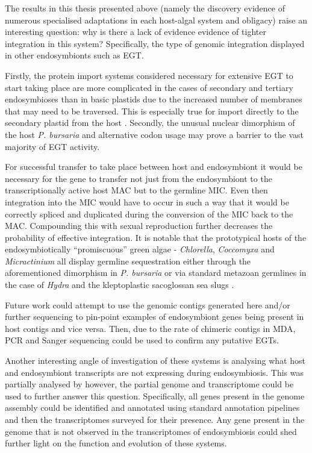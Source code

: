 The results in this thesis presented above (namely the discovery evidence
of numerous specialised adaptations in each host-algal system and 
obligacy) raise an interesting question:
why is there a lack of evidence evidence of tighter 
integration in this system?  Specifically, the type of genomic
integration displayed in other endosymbionts such as EGT.

Firstly, the protein import systems considered necessary for extensive
EGT to start taking place are more complicated
in the cases of secondary and tertiary endosymbioses
than in basic plastids due to the increased number
of membranes that may need to be traversed. This is especially true
for import directly to the secondary plastid from the
host \citep{Hirakawa2012}.
Secondly, the unusual nuclear dimorphism of the host \textit{P. bursaria}
and alternative codon usage may prove a barrier to the vast majority of EGT activity. 

For successful transfer to take place between host and endosymbiont it
would be necessary for the gene to transfer not just from the 
endosymbiont to the transcriptionally active host MAC but to the germline
MIC.  Even then integration into the MIC would have to occur in such a way
that it would be correctly spliced and duplicated during the conversion of the MIC
back to the MAC.
Compounding this with sexual reproduction further decreases the probability of
effective integration.
It is notable that the prototypical hosts of the endosymbiotically ``promiscuous''
green algae - \textit{Chlorella}, \textit{Coccomyxa} and \textit{Micractinium} 
all display germline sequestration either through the aforementioned dimorphism
in \textit{P. bursaria} or via standard metazoan germlines in the case of
\textit{Hydra} \citep{Kawaida2013} and the kleptoplastic sacoglossan sea slugs \citep{Yellowlees2008}.



Future work could attempt to use the genomic contigs generated here
and/or further sequencing to pin-point examples of endosymbiont
genes being present in host contigs and vice versa. Then, due to the rate of 
chimeric contigs in MDA, PCR and Sanger sequencing could be used to confirm
any putative EGTs.

Another interesting angle of investigation of these systems is
analysing what host and endosymbiont transcripts are not expressing during endosymbiosis.
This was partially analysed by \citep{Kodama2014} however, 
the partial genome and transcriptome could be used to further
answer this question.  Specifically, all genes present in the genome assembly
could be identified and annotated using standard annotation pipelines
and then the transcriptomes surveyed for their presence.  Any gene
present in the genome that is not observed in the 
transcriptomes of endosymbiosis
could shed further light on the function
and evolution of these systems.


